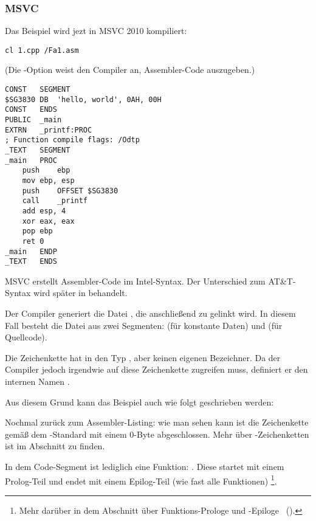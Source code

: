 \subsubsection{MSVC}

Das Beispiel wird jezt in MSVC 2010 kompiliert:

\begin{lstlisting}
cl 1.cpp /Fa1.asm
\end{lstlisting}

(Die -Option weist den Compiler an, Assembler-Code auszugeben.)

\begin{lstlisting}[caption=MSVC 2010,style=customasmx86]
CONST	SEGMENT
$SG3830	DB	'hello, world', 0AH, 00H
CONST	ENDS
PUBLIC	_main
EXTRN	_printf:PROC
; Function compile flags: /Odtp
_TEXT	SEGMENT
_main	PROC
	push	ebp
	mov	ebp, esp
	push	OFFSET $SG3830
	call	_printf
	add	esp, 4
	xor	eax, eax
	pop	ebp
	ret	0
_main	ENDP
_TEXT	ENDS
\end{lstlisting}

MSVC erstellt Assembler-Code im Intel-Syntax.
Der Unterschied zum AT\&T-Syntax wird später in  behandelt.

Der Compiler generiert die Datei , die anschließend zu  gelinkt wird.
In diesem Fall besteht die Datei aus zwei Segmenten:  (für konstante Daten) und  (für Quellcode).

\label{string_is_const_char}
Die Zeichenkette  hat in \CCpp den Typ , aber keinen eigenen Bezeichner.
Da der Compiler jedoch irgendwie auf diese Zeichenkette zugreifen muss, definiert er den internen Namen .

Aus diesem Grund kann das Beispiel auch wie folgt geschrieben werden:



Nochmal zurück zum Assembler-Listing: wie man sehen kann ist die Zeichenkette gemäß dem \CCpp-Standard mit einem 0-Byte abgeschlossen.
Mehr über \CCpp-Zeichenketten ist im Abschnitt  zu finden.

In dem Code-Segment  ist lediglich eine Funktion: \main{}.
Diese startet mit einem Prolog-Teil und endet mit einem Epilog-Teil (wie fast alle Funktionen)
\footnote{Mehr darüber in dem Abschnitt über Funktions-Prologe und -Epiloge ~().}.

